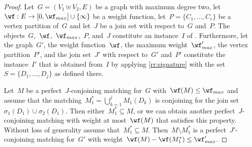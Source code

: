 \begin{proof}
  Let~$G = (V_1 \uplus V_2, E)$ be a graph with maximum degree two, let ~$\wf:E \rightarrow [0, \wf_{max}]\cup \{\infty\}$ be a weight function, let~$P = \{C_1, \ldots, C_c\}$ be a vertex partition of~$G$ and let~$J$ be a join set with respect to~$G$ and~$P$. The objects~$G$,~$\wf$,~$\wf_{max}$,~$P$, and~$J$ constitute an instance~$I$ of \pCBMs{}. Furthermore, let the graph~$G'$, the weight function~$\wf$, the maximum weight~$\wf_{max}'$, the vertex partition~$P'$, and the join set~$J'$ with respect to~$G'$ and~$P'$ constitute the instance~$I'$ that is obtained from~$I$ by applying \autoref{rr:signature} with the set~$S = \{D_{1}, \ldots, D_{j}\}$ as defined there.

  Let~$M$ be a perfect~$J$-conjoining matching for~$G$ with~$\wf(M) \leq \wf_{max}$ and assume that the matching~$M_1^* = \bigcup_{k = 1}^jM_1(D_{k})$ is conjoining for the join set~$\sigma_1(D_{1}) \cup \sigma_2(D_{1})$. Then either~$M_1^* \subseteq M$, or we can obtain another perfect~$J$-conjoining matching with weight at most~$\wf(M)$ that satisfies this property. Without loss of generality assume that~$M_1^* \subseteq M$. Then~$M \setminus M_1^*$ is a perfect~$J'$-conjoining matching for~$G'$ with weight~$\wf(M) - \wf(M_1^*) \leq \wf_{max}'$. 


\end{proof}
